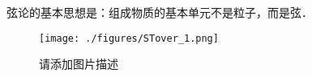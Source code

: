 弦论的基本思想是：组成物质的基本单元不是粒子，而是弦．
\begin{figure}[ht]
\centering
\texttt{[image: ./figures/STover\_1.png]}
\caption{请添加图片描述} \label{STover_fig1}
\end{figure}
